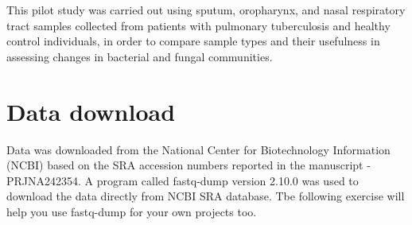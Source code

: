 \documentclass[
]{book}
\begin{document}
This pilot study was carried out using sputum, oropharynx, and nasal respiratory tract samples collected from patients
with pulmonary tuberculosis and healthy control individuals, in order to compare sample types and their usefulness in
assessing changes in bacterial and fungal communities.

\hypertarget{data-download}{%
\section{Data download}\label{data-download}}

Data was downloaded from the National Center for Biotechnology Information (NCBI) based on the SRA accession
numbers reported in the manuscript - PRJNA242354.
A program called fastq-dump version 2.10.0 was used to download the data directly from NCBI SRA database. Tbe
following exercise will help you use fastq-dump for your own projects too.
\end{document}
